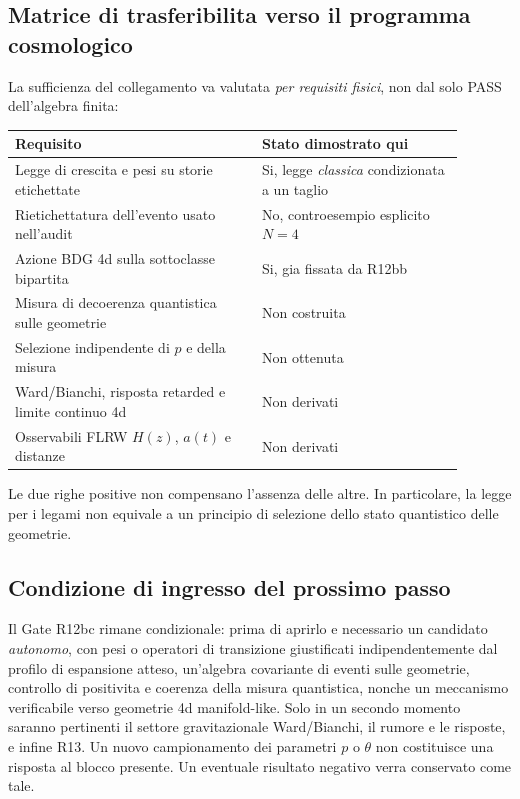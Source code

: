 \documentclass[11pt,a4paper]{article}
\begin{document}
\subsection*{Matrice di trasferibilita verso il programma cosmologico}
La sufficienza del collegamento va valutata \emph{per requisiti fisici}, non dal solo PASS dell'algebra finita:
\begin{center}
\small
\begin{tabular}{p{0.49\linewidth}p{0.40\linewidth}}
\toprule
\textbf{Requisito} & \textbf{Stato dimostrato qui}\\
\midrule
Legge di crescita e pesi su storie etichettate & Si, legge \emph{classica} condizionata a un taglio\\
Rietichettatura dell'evento usato nell'audit & No, controesempio esplicito $N=4$\\
Azione BDG 4d sulla sottoclasse bipartita & Si, gia fissata da R12bb\\
Misura di decoerenza quantistica sulle geometrie & Non costruita\\
Selezione indipendente di $p$ e della misura & Non ottenuta\\
Ward/Bianchi, risposta retarded e limite continuo 4d & Non derivati\\
Osservabili FLRW $H(z)$, $a(t)$ e distanze & Non derivati\\
\bottomrule
\end{tabular}
\end{center}
Le due righe positive non compensano l'assenza delle altre. In particolare, la legge per i legami non equivale a un principio di selezione dello stato quantistico delle geometrie.

\subsection*{Condizione di ingresso del prossimo passo}
Il Gate R12bc rimane condizionale: prima di aprirlo e necessario un candidato \emph{autonomo}, con pesi o operatori di transizione giustificati indipendentemente dal profilo di espansione atteso, un'algebra covariante di eventi sulle geometrie, controllo di positivita e coerenza della misura quantistica, nonche un meccanismo verificabile verso geometrie 4d manifold-like. Solo in un secondo momento saranno pertinenti il settore gravitazionale Ward/Bianchi, il rumore e le risposte, e infine R13. Un nuovo campionamento dei parametri $p$ o $\theta$ non costituisce una risposta al blocco presente. Un eventuale risultato negativo verra conservato come tale.
\end{document}
